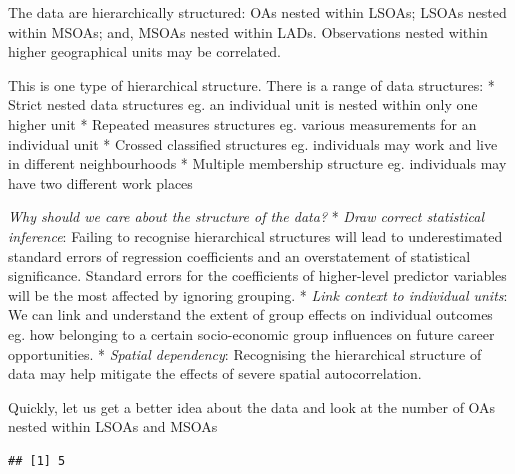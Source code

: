 \documentclass[]{book}
\newenvironment{Shaded}{\begin{snugshade}}{\end{snugshade}}
\newcommand{\KeywordTok}[1]{\textcolor[rgb]{0.13,0.29,0.53}{\textbf{#1}}}
\newcommand{\DecValTok}[1]{\textcolor[rgb]{0.00,0.00,0.81}{#1}}
\newcommand{\StringTok}[1]{\textcolor[rgb]{0.31,0.60,0.02}{#1}}
\newcommand{\CommentTok}[1]{\textcolor[rgb]{0.56,0.35,0.01}{\textit{#1}}}
\newcommand{\OperatorTok}[1]{\textcolor[rgb]{0.81,0.36,0.00}{\textbf{#1}}}
\newcommand{\NormalTok}[1]{#1}
\begin{document}
The data are hierarchically structured: OAs nested within LSOAs; LSOAs
nested within MSOAs; and, MSOAs nested within LADs. Observations nested
within higher geographical units may be correlated.

This is one type of hierarchical structure. There is a range of data
structures: * Strict nested data structures eg. an individual unit is
nested within only one higher unit * Repeated measures structures eg.
various measurements for an individual unit * Crossed classified
structures eg. individuals may work and live in different neighbourhoods
* Multiple membership structure eg. individuals may have two different
work places

\emph{Why should we care about the structure of the data?} * \emph{Draw
correct statistical inference}: Failing to recognise hierarchical
structures will lead to underestimated standard errors of regression
coefficients and an overstatement of statistical significance. Standard
errors for the coefficients of higher-level predictor variables will be
the most affected by ignoring grouping. * \emph{Link context to
individual units}: We can link and understand the extent of group
effects on individual outcomes eg. how belonging to a certain
socio-economic group influences on future career opportunities. *
\emph{Spatial dependency}: Recognising the hierarchical structure of
data may help mitigate the effects of severe spatial autocorrelation.

Quickly, let us get a better idea about the data and look at the number
of OAs nested within LSOAs and MSOAs

\begin{Shaded}
\end{Shaded}

\begin{verbatim}
## [1] 5
\end{verbatim}

\begin{Shaded}
\end{Shaded}
\end{document}
